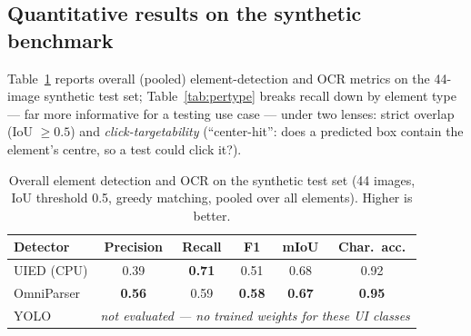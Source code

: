 \documentclass[11pt,a4paper]{article}
\begin{document}
\subsection{Quantitative results on the synthetic benchmark}
Table~\ref{tab:results} reports overall (pooled) element-detection and OCR metrics
on the 44-image synthetic test set; Table~\ref{tab:pertype} breaks recall down by
element type --- far more informative for a testing use case --- under two lenses:
strict overlap (IoU $\geq 0.5$) and \emph{click-targetability} (``center-hit'': does
a predicted box contain the element's centre, so a test could click it?).

\begin{table}[H]
  \centering
  \caption{Overall element detection and OCR on the synthetic test set (44 images,
  IoU threshold 0.5, greedy matching, pooled over all elements). Higher is better.}
  \label{tab:results}
  \begin{tabular}{lccccc}
    \toprule
    Detector & Precision & Recall & F1 & mIoU & Char.\ acc. \\
    \midrule
    UIED (CPU)   & 0.39 & \textbf{0.71} & 0.51 & 0.68 & 0.92 \\
    OmniParser   & \textbf{0.56} & 0.59 & \textbf{0.58} & \textbf{0.67} & \textbf{0.95} \\
    YOLO         & \multicolumn{5}{c}{\emph{not evaluated --- no trained weights for these UI classes}} \\
    \bottomrule
  \end{tabular}
\end{table}
\end{document}
